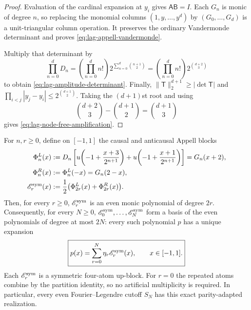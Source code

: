 \begin{proof}
Evaluation of the cardinal expansion at $y_i$ gives
$\mathsf A\mathsf B=I$.  Each $G_n$ is monic of degree $n$, so replacing the
monomial columns $(1,y,\ldots,y^d)$ by $(G_0,\ldots,G_d)$ is a unit-triangular
column operation.  It preserves the ordinary Vandermonde determinant and
proves \eqref{eq:lag-appell-vandermonde}.

Multiply that determinant by
\[
 \prod_{n=0}^{d}D_n
 =\left(\prod_{n=0}^{d}n!\right)
 2^{\sum_{n=0}^{d}\binom{n+1}{2}}
 =\left(\prod_{n=0}^{d}n!\right)2^{\binom{d+2}{3}}
\]
to obtain \eqref{eq:lag-amplitude-determinant}.  Finally,
$\|\mathsf T\|_2^{d+1}\ge|\det\mathsf T|$ and
$\prod_{i<j}|y_j-y_i|\le2^{\binom{d+1}{2}}$.  Taking the
$(d+1)$st root and using
\[
 \binom{d+2}{3}-\binom{d+1}{2}=\binom{d+1}{3}
\]
gives \eqref{eq:lag-node-free-amplification}.
\end{proof}

\begin{proposition}
\label{prop:lag-even-four-atom-ladder}
For $n,r\ge0$, define on $[-1,1]$ the causal and anticausal Appell blocks
\begin{align}
 \Phi_n^L(x)
 &:=D_n\left[
 u\!\left(-1+\frac{x+3}{2^{n+1}}\right)
 +u\!\left(-1+\frac{x+1}{2^{n+1}}\right)
 \right]=G_n(x+2),
 \label{eq:lag-left-appell-block}\\
 \Phi_n^R(x)&:=\Phi_n^L(-x)=G_n(2-x),
 \label{eq:lag-right-appell-block}\\
 \mathscr E_r^{\rm sym}(x)
 &:=\frac12\bigl(\Phi_{2r}^L(x)+\Phi_{2r}^R(x)\bigr).
 \label{eq:lag-even-appell-block}
\end{align}
Then, for every $r\ge0$, $\mathscr E_r^{\rm sym}$ is an even monic polynomial
of degree $2r$.  Consequently, for every $N\ge0$,
$\mathscr E_0^{\rm sym},\ldots,\mathscr E_N^{\rm sym}$ form a basis of the
even polynomials of degree at most
$2N$: every such polynomial $p$ has a unique expansion
\begin{equation}
 \boxed{p(x)=\sum_{r=0}^{N}\eta_r\mathscr E_r^{\rm sym}(x),
 \qquad x\in[-1,1].}
 \label{eq:lag-even-appell-expansion}
\end{equation}
Each $\mathscr E_r^{\rm sym}$ is a symmetric four-atom up-block.  For $r=0$
the repeated atoms
combine by the partition identity, so no artificial multiplicity is required.
In particular, every even Fourier--Legendre cutoff $S_N$ has this exact
parity-adapted realization.
\end{proposition}

